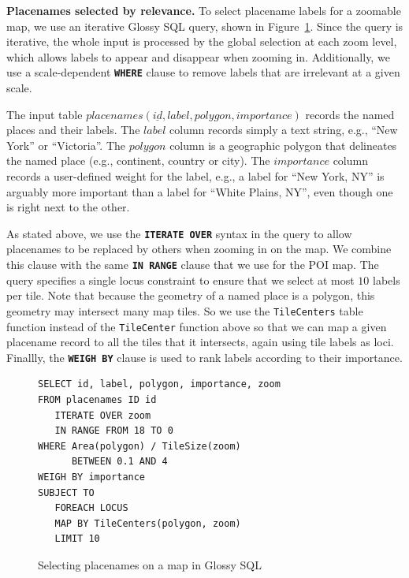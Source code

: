 \documentclass[11pt, oneside]{report}
\newcommand{\minisec}[1]{\noindent\textbf{#1.}}
\begin{document}
{\minisec{Placenames selected by relevance}
To select placename labels for a zoomable map, we use an iterative Glossy SQL query, shown in Figure~\ref{fig:glossy:sql:placenames}. Since the query is iterative, the whole input is processed by the global selection at each zoom level, which allows labels to appear and disappear when zooming in. Additionally, we use a scale-dependent \textbf{\texttt{WHERE}} clause to remove labels that are irrelevant at a given scale.

The input table $placenames(\underline{id}, label, polygon, importance)$ records the named places and their labels. The $label$ column records simply a text string, e.g., ``New York'' or ``Victoria''. The $polygon$ column is a geographic polygon that delineates the named place (e.g., continent, country or city). The $importance$ column records a user-defined weight for the label, e.g., a label for ``New York, NY'' is arguably more important than a label for ``White Plains, NY'', even though one is right next to the other.

As stated above, we use the \textbf{\texttt{ITERATE OVER}} syntax in the query to allow placenames to be replaced by others when zooming in on the map. We combine this clause with the same \textbf{\texttt{IN RANGE}} clause that we use for the POI map. The query specifies a single locus constraint to ensure that we select at most $10$ labels per tile. Note that because the geometry of a named place is a polygon, this geometry may intersect many map tiles. So we use the \texttt{TileCenters} table function instead of the \texttt{TileCenter} function above so that we can map a given placename record to all the tiles that it intersects, again using tile labels as loci.  
Finallly, the \textbf{\texttt{WEIGH BY}} clause is used to rank labels according to their importance. 

\begin{figure}[!t]
\begin{center}
\begin{lstlisting}
SELECT id, label, polygon, importance, zoom
FROM placenames ID id
   ITERATE OVER zoom 
   IN RANGE FROM 18 TO 0
WHERE Area(polygon) / TileSize(zoom) 
      BETWEEN 0.1 AND 4
WEIGH BY importance
SUBJECT TO
   FOREACH LOCUS
   MAP BY TileCenters(polygon, zoom)
   LIMIT 10
\end{lstlisting}
\caption{Selecting placenames on a map in Glossy SQL}
\label{fig:glossy:sql:placenames}
\end{center}
\end{figure}

}
\end{document}
